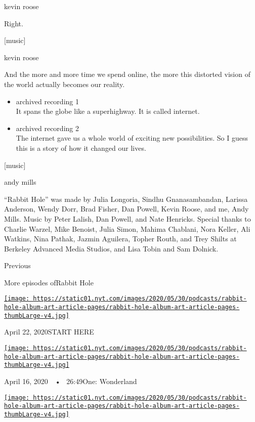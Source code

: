 kevin roose

Right.

{[}music{]}

kevin roose

And the more and more time we spend online, the more this distorted
vision of the world actually becomes our reality.

\begin{itemize}
\item
  archived recording 1\\
  It spans the globe like a superhighway. It is called internet.
\item
  archived recording 2\\
  The internet gave us a whole world of exciting new possibilities. So I
  guess this is a story of how it changed our lives.
\end{itemize}

{[}music{]}

andy mills

``Rabbit Hole'' was made by Julia Longoria, Sindhu Gnanasambandan,
Larissa Anderson, Wendy Dorr, Brad Fisher, Dan Powell, Kevin Roose, and
me, Andy Mills. Music by Peter Lalish, Dan Powell, and Nate Henricks.
Special thanks to Charlie Warzel, Mike Benoist, Julia Simon, Mahima
Chablani, Nora Keller, Ali Watkins, Nina Pathak, Jazmin Aguilera, Topher
Routh, and Trey Shilts at Berkeley Advanced Media Studios, and Lisa
Tobin and Sam Dolnick.

Previous

More episodes ofRabbit Hole

\href{https://www.nytimes.com/2020/04/22/podcasts/rabbit-hole-prologue.html?action=click\&module=audio-series-bar\&region=header\&pgtype=Article}{\texttt{[image: https://static01.nyt.com/images/2020/05/30/podcasts/rabbit-hole-album-art-article-pages/rabbit-hole-album-art-article-pages-thumbLarge-v4.jpg]}}

April 22, 2020START HERE

\href{https://www.nytimes.com/2020/04/16/podcasts/rabbit-hole-internet-youtube-virus.html?action=click\&module=audio-series-bar\&region=header\&pgtype=Article}{\texttt{[image: https://static01.nyt.com/images/2020/05/30/podcasts/rabbit-hole-album-art-article-pages/rabbit-hole-album-art-article-pages-thumbLarge-v4.jpg]}}

April 16, 2020~~•~ 26:49One: Wonderland

\href{https://www.nytimes.com/2020/04/23/podcasts/rabbit-hole-internet-youtube-virus.html?action=click\&module=audio-series-bar\&region=header\&pgtype=Article}{\texttt{[image: https://static01.nyt.com/images/2020/05/30/podcasts/rabbit-hole-album-art-article-pages/rabbit-hole-album-art-article-pages-thumbLarge-v4.jpg]}}

